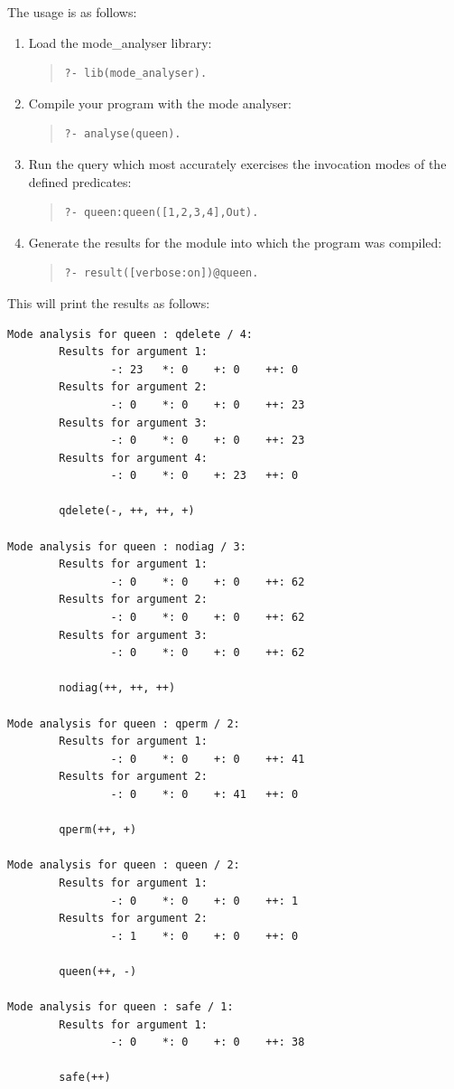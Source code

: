 The usage is as follows: 
\begin{enumerate}
\item Load the mode_analyser library:
\begin{quote}\begin{verbatim}
?- lib(mode_analyser).
\end{verbatim}\end{quote}
\item Compile your program with the mode analyser:
\begin{quote}\begin{verbatim}
?- analyse(queen).
\end{verbatim}\end{quote}
\item Run the query which most accurately exercises the 
invocation modes of the defined predicates: 
\begin{quote}\begin{verbatim}
?- queen:queen([1,2,3,4],Out).
\end{verbatim}\end{quote}
\item Generate the results for the module into which 
the program was compiled:
\begin{quote}\begin{verbatim}
?- result([verbose:on])@queen.
\end{verbatim}\end{quote}
\end{enumerate}
This will print the results as follows:
\begin{verbatim}
Mode analysis for queen : qdelete / 4:
        Results for argument 1:
                -: 23   *: 0    +: 0    ++: 0
        Results for argument 2:
                -: 0    *: 0    +: 0    ++: 23
        Results for argument 3:
                -: 0    *: 0    +: 0    ++: 23
        Results for argument 4:
                -: 0    *: 0    +: 23   ++: 0

        qdelete(-, ++, ++, +)

Mode analysis for queen : nodiag / 3:
        Results for argument 1:
                -: 0    *: 0    +: 0    ++: 62
        Results for argument 2:
                -: 0    *: 0    +: 0    ++: 62
        Results for argument 3:
                -: 0    *: 0    +: 0    ++: 62

        nodiag(++, ++, ++)

Mode analysis for queen : qperm / 2:
        Results for argument 1:
                -: 0    *: 0    +: 0    ++: 41
        Results for argument 2:
                -: 0    *: 0    +: 41   ++: 0

        qperm(++, +)

Mode analysis for queen : queen / 2:
        Results for argument 1:
                -: 0    *: 0    +: 0    ++: 1
        Results for argument 2:
                -: 1    *: 0    +: 0    ++: 0

        queen(++, -)

Mode analysis for queen : safe / 1:
        Results for argument 1:
                -: 0    *: 0    +: 0    ++: 38

        safe(++)
\end{verbatim}

